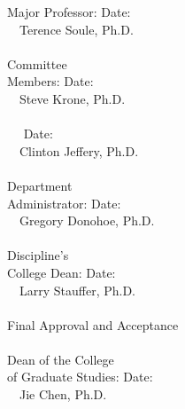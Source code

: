 \documentclass[12pt,letterpaper]{report}
\begin{document}
\begin{singlespace}
\noindent
Major Professor:
\tabto{4cm}\underline{\makebox[2.8in][l]{\ }}
Date:
\underline{\makebox[1.2in][+l]{\ }}\\
\ \ \indent\indent\indent\indent\indent\indent\indent Terence Soule, Ph.D.\\
\ \\
Committee\\
Members:
\tabto{4cm}\underline{\makebox[2.8in][l]{\ }}
Date:
\underline{\makebox[1.2in][l]{\ }}\\
\ \ \indent\indent\indent\indent\indent\indent\indent Steve Krone, Ph.D.\\
\ \\
\ \ \indent\indent\indent\indent\indent\indent
\tabto{4cm}\underline{\makebox[2.8in][l]{\ }}
Date:
\underline{\makebox[1.2in][l]{\ }}\\
\ \ \indent\indent\indent\indent\indent\indent\indent Clinton Jeffery, Ph.D.\\
\ \\
Department\\
Administrator:
\tabto{4cm}\underline{\makebox[2.8in][l]{\ }}
Date:
\underline{\makebox[1.2in][l]{\ }}\\
\ \ \indent\indent\indent\indent\indent\indent\indent Gregory Donohoe, Ph.D.\\
\ \\
Discipline's\\
College Dean:
\tabto{4cm}\underline{\makebox[2.8in][l]{\ }}
Date:
\underline{\makebox[1.2in][l]{\ }}\\
\ \ \indent\indent\indent\indent\indent\indent\indent Larry Stauffer, Ph.D.\\
\ \\
Final Approval and Acceptance\\
\ \\
Dean of the College\\
of Graduate Studies:
\tabto{4cm}\underline{\makebox[2.8in][l]{\ }}
Date:
\underline{\makebox[1.2in][l]{\ }}\\
\ \ \indent\indent\indent\indent\indent\indent\indent Jie Chen, Ph.D.\\
\end{singlespace}
\pagebreak


\pagebreak


\pagebreak
\end{document}
